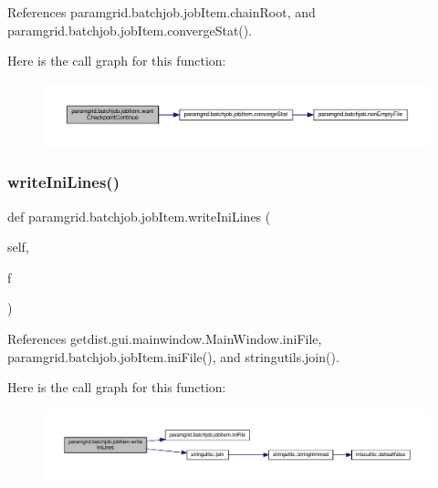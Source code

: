 References paramgrid.\+batchjob.\+job\+Item.\+chain\+Root, and paramgrid.\+batchjob.\+job\+Item.\+converge\+Stat().

Here is the call graph for this function\+:
\nopagebreak
\begin{figure}[H]
\begin{center}
\leavevmode
\includegraphics[width=350pt]{classparamgrid_1_1batchjob_1_1jobItem_aa728ccb7030aaa62a0bc94544aac3997_cgraph}
\end{center}
\end{figure}
\mbox{\label{classparamgrid_1_1batchjob_1_1jobItem_ac013be4523b3bc72635b183e498db58d}} 
\subsubsection{\texorpdfstring{write\+Ini\+Lines()}{writeIniLines()}}
{\footnotesize\ttfamily def paramgrid.\+batchjob.\+job\+Item.\+write\+Ini\+Lines (\begin{DoxyParamCaption}\item[{}]{self,  }\item[{}]{f }\end{DoxyParamCaption})}



References getdist.\+gui.\+mainwindow.\+Main\+Window.\+ini\+File, paramgrid.\+batchjob.\+job\+Item.\+ini\+File(), and stringutils.\+join().

Here is the call graph for this function\+:
\nopagebreak
\begin{figure}[H]
\begin{center}
\leavevmode
\includegraphics[width=350pt]{classparamgrid_1_1batchjob_1_1jobItem_ac013be4523b3bc72635b183e498db58d_cgraph}
\end{center}
\end{figure}


